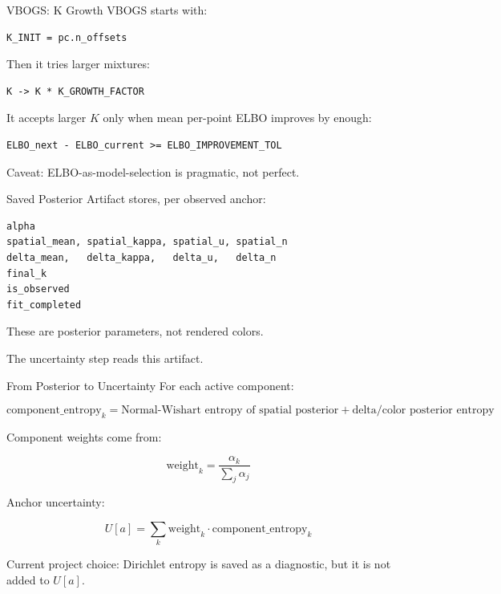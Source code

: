 \documentclass[aspectratio=169]{beamer}
\begin{document}
\begin{frame}[fragile]{VBOGS: K Growth}
  VBOGS starts with:

\begin{verbatim}
K_INIT = pc.n_offsets
\end{verbatim}

  Then it tries larger mixtures:

\begin{verbatim}
K -> K * K_GROWTH_FACTOR
\end{verbatim}

  It accepts larger \(K\) only when mean per-point ELBO improves by enough:

\begin{verbatim}
ELBO_next - ELBO_current >= ELBO_IMPROVEMENT_TOL
\end{verbatim}

  Caveat: ELBO-as-model-selection is pragmatic, not perfect.
\end{frame}

\begin{frame}[fragile]{Saved Posterior Artifact}
   stores, per observed anchor:

\begin{verbatim}
alpha
spatial_mean, spatial_kappa, spatial_u, spatial_n
delta_mean,   delta_kappa,   delta_u,   delta_n
final_k
is_observed
fit_completed
\end{verbatim}

  These are posterior parameters, not rendered colors.

  \vspace{0.8em}
  The uncertainty step reads this artifact.
\end{frame}

\begin{frame}{From Posterior to Uncertainty}
  For each active component:

  \[
    \text{component\_entropy}_k
    =
    \text{Normal-Wishart entropy of spatial posterior}
    +
    \text{delta/color posterior entropy}
  \]

  Component weights come from:

  \[
    \text{weight}_k = \frac{\alpha_k}{\sum_j \alpha_j}
  \]

  Anchor uncertainty:

  \[
    U[a] = \sum_k \text{weight}_k \cdot \text{component\_entropy}_k
  \]

  Current project choice: Dirichlet entropy is saved as a diagnostic, but it is
  not added to \(U[a]\).
\end{frame}
\end{document}
